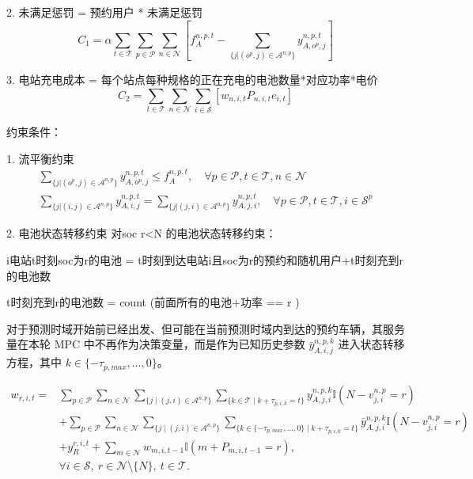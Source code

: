 \documentclass[12pt,hyperref,a4paper,UTF8]{ctexart}
\begin{document}
2. 未满足惩罚 = 预约用户 * 未满足惩罚
\begin{equation}
C_1 = \alpha \sum_{t\in \mathcal{T}} \sum_{p\in \mathcal{P}}  \sum_{n\in \mathcal{N}} 
\left[
f^{n,p,t}_A - \sum_{\{j | (o^p,j) \in \mathcal{A}^{n,p}\}} y^{n,p,t}_{A,o^p,j} \right]
\label{eq:penaltycost}
\end{equation}

3. 电站充电成本 = 每个站点每种规格的正在充电的电池数量*对应功率*电价
\begin{equation}
C_2 = \sum_{t \in \mathcal{T}}  \sum_{n \in \mathcal{N}} \sum_{i \in \mathcal{S}}
\left[
w_{n,i,t}P_{n,i,t}e_{i,t}
\right]
\end{equation}

约束条件：

1. 流平衡约束
\begin{subequations}
\label{eq:flow}
\begin{gather}
\sum_{\{j| (o^p,j)\in \mathcal{A}^{n,p}\}}{y^{n,p,t}_{A,o^p,j}} \leq f^{n,p,t}_A,\quad \forall{p\in \mathcal{P},t\in \mathcal{T}},n \in \mathcal{N}\label{eq:flow1}\\
\sum_{\{j| (i,j)\in \mathcal{A}^{n,p}\}}{y^{n,p,t}_{A,i,j}} =\sum_{\{j| (j,i)\in \mathcal{A}^{n,p}\}}{y^{n,p,t}_{A,j,i}},\quad \forall{p\in \mathcal{P},t\in \mathcal{T},i\in \mathcal{S}^p}\label{eq:flow2}
\end{gather}
\end{subequations}

2. 电池状态转移约束
对soc r<N 的电池状态转移约束：

i电站t时刻soc为r的电池 = t时刻到达电站i且soc为r的预约和随机用户+t时刻充到r的电池数

t时刻充到r的电池数 = count (前面所有的电池+功率 == r )


对于预测时域开始前已经出发、但可能在当前预测时域内到达的预约车辆，其服务量在本轮 MPC 中不再作为决策变量，而是作为已知历史参数 $\bar{y}_{A,i,j}^{n,p,k}$ 进入状态转移方程，其中 $k\in\{-\tau_{p,max},\ldots,0\}$。

\begin{equation}
\begin{aligned}
w_{r,i,t}
=&
\sum_{p\in \mathcal{P}}
\sum_{n\in \mathcal{N}}
\sum_{\{j\mid (j,i)\in \mathcal{A}^{n,p}\}}
\sum_{\{k\in \mathcal{T}\mid k+\tau_{p,i,k}=t\}}
y^{n,p,k}_{A,j,i}
\mathbb{I}\!\left(N-v^{n,p}_{j,i}=r\right)
\\
&+
\sum_{p\in \mathcal{P}}
\sum_{n\in \mathcal{N}}
\sum_{\{j\mid (j,i)\in \mathcal{A}^{n,p}\}}
\sum_{\{k\in \{-\tau_{p,max},\ldots,0\}\mid k+\tau_{p,i,k}=t\}}
\bar{y}^{n,p,k}_{A,j,i}
\mathbb{I}\!\left(N-v^{n,p}_{j,i}=r\right)
\\
&+
y^{r,i,t}_{R}
+
\sum_{m\in \mathcal{N}}
w_{m,i,t-1}
\mathbb{I}\!\left(m+P_{m,i,t-1}=r\right),
\\
&\forall i\in \mathcal{S},\ r\in \mathcal{N}\setminus\{N\},\ t\in \mathcal{T}.
\end{aligned}
\tag{7a}
\end{equation}
\end{document}
